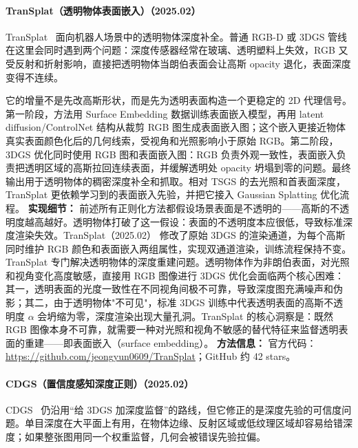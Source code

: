 \paragraph{TranSplat（透明物体表面嵌入）（2025.02）}
TranSplat~\cite{2502_07840} 面向机器人场景中的透明物体深度补全。普通 RGB-D 或 3DGS 管线在这里会同时遇到两个问题：深度传感器经常在玻璃、透明塑料上失效，RGB 又受反射和折射影响，直接把透明物体当朗伯表面会让高斯 opacity 退化，表面深度变得不连续。

它的增量不是先改高斯形状，而是先为透明表面构造一个更稳定的 2D 代理信号。第一阶段，方法用 Surface Embedding 数据训练表面嵌入模型，再用 latent diffusion/ControlNet 结构从裁剪 RGB 图生成表面嵌入图；这个嵌入更接近物体真实表面颜色化后的几何线索，受视角和光照影响小于原始 RGB。第二阶段，3DGS 优化同时使用 RGB 图和表面嵌入图：RGB 负责外观一致性，表面嵌入负责把透明区域的高斯拉回连续表面，并缓解透明处 opacity 坍塌到零的问题。最终输出用于透明物体的稠密深度补全和抓取。相对 TSGS 的去光照和首表面深度，TranSplat 更依赖学习到的表面嵌入先验，并把它接入 Gaussian Splatting 优化流程。
\textbf{实现细节：} 前述所有正则化方法都假设场景表面是不透明的——高斯的不透明度越高越好。透明物体打破了这一假设：表面的不透明度本应很低，导致标准深度渲染失效。TranSplat（2025.02） 修改了原始 3DGS 的渲染通道，为每个高斯同时维护 RGB 颜色和表面嵌入两组属性，实现双通道渲染，训练流程保持不变。TranSplat 专门解决透明物体的深度重建问题。透明物体作为非朗伯表面，对光照和视角变化高度敏感，直接用 RGB 图像进行 3DGS 优化会面临两个核心困难：其一，透明表面的光度一致性在不同视角间极不可靠，导致深度图充满噪声和伪影；其二，由于透明物体"不可见"，标准 3DGS 训练中代表透明表面的高斯不透明度 $\alpha$ 会坍缩为零，深度渲染出现大量孔洞。TranSplat 的核心洞察是：既然 RGB 图像本身不可靠，就需要一种对光照和视角不敏感的替代特征来监督透明表面的重建——即表面嵌入（surface embedding）。
\textbf{方法信息：} 官方代码：\url{https://github.com/jeongyun0609/TranSplat}；GitHub 约 42 stars。



\paragraph{CDGS（置信度感知深度正则）（2025.02）}
CDGS~\cite{2502_14684} 仍沿用“给 3DGS 加深度监督”的路线，但它修正的是深度先验的可信度问题。单目深度在大平面上有用，在物体边缘、反射区域或低纹理区域却容易给错深度；如果整张图用同一个权重监督，几何会被错误先验拉偏。

